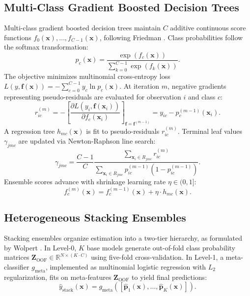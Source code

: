 \documentclass[10pt,conference,compsoc]{IEEEtran}
\begin{document}
\subsection{Multi-Class Gradient Boosted Decision Trees}
Multi-class gradient boosted decision trees maintain $C$ additive continuous score functions $f_0(\mathbf{x}), \dots, f_{C-1}(\mathbf{x})$, following Friedman \cite{friedman2001}. Class probabilities follow the softmax transformation:
\begin{equation}
p_c(\mathbf{x}) = \frac{\exp(f_c(\mathbf{x}))}{\sum_{k=0}^{C-1} \exp(f_k(\mathbf{x}))}.
\end{equation}
The objective minimizes multinomial cross-entropy loss $L(y, \mathbf{f}(\mathbf{x})) = -\sum_{c=0}^{C-1} y_c \ln p_c(\mathbf{x})$. At iteration $m$, negative gradients representing pseudo-residuals are evaluated for observation $i$ and class $c$:
\begin{equation}
r_{ic}^{(m)} = -\left[ \frac{\partial L(y_i, \mathbf{f}(\mathbf{x}_i))}{\partial f_c(\mathbf{x}_i)} \right]_{\mathbf{f}=\mathbf{f}^{(m-1)}} = y_{ic} - p_c^{(m-1)}(\mathbf{x}_i).
\end{equation}
A regression tree $h_{mc}(\mathbf{x})$ is fit to pseudo-residuals $r_{ic}^{(m)}$. Terminal leaf values $\gamma_{jmc}$ are updated via Newton-Raphson line search:
\begin{equation}
\gamma_{jmc} = \frac{C-1}{C} \frac{\sum_{\mathbf{x}_i \in R_{jmc}} r_{ic}^{(m)}}{\sum_{\mathbf{x}_i \in R_{jmc}} p_{ic}^{(m-1)} (1 - p_{ic}^{(m-1)})}.
\end{equation}
Ensemble scores advance with shrinkage learning rate $\eta \in (0, 1]$:
\begin{equation}
f_c^{(m)}(\mathbf{x}) = f_c^{(m-1)}(\mathbf{x}) + \eta \cdot h_{mc}(\mathbf{x}).
\end{equation}

\subsection{Heterogeneous Stacking Ensembles}
Stacking ensembles organize estimation into a two-tier hierarchy, as formulated by Wolpert \cite{wolpert1992}. In Level-0, $K$ base models generate out-of-fold class probability matrices $\mathbf{Z}_{\text{OOF}} \in \mathbb{R}^{N \times (K \cdot C)}$ using five-fold cross-validation. In Level-1, a meta-classifier $g_{\text{meta}}$, implemented as multinomial logistic regression with $L_2$ regularization, fits on meta-features $\mathbf{Z}_{\text{OOF}}$ to yield final predictions:
\begin{equation}
\hat{y}_{\text{stack}}(\mathbf{x}) = g_{\text{meta}}\left( [\hat{\mathbf{p}}_1(\mathbf{x}), \dots, \hat{\mathbf{p}}_K(\mathbf{x})] \right).
\end{equation}
\end{document}
